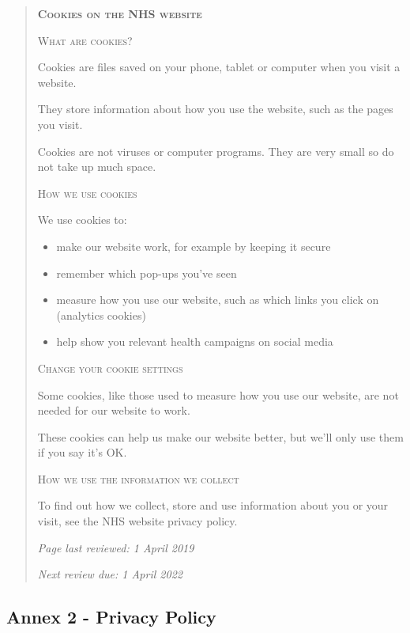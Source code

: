 \documentclass[twocolumn, letterpaper,13pt]{scrartcl}
\begin{document}
	\begin{quote}
        \textbf{\textsc{Cookies on the NHS website}}
        
        \textsc{What are cookies?}
        
        Cookies are files saved on your phone, tablet or computer when you visit a website.
        
        They store information about how you use the website, such as the pages you visit.
        
        Cookies are not viruses or computer programs. They are very small so do not take up much space.
        
        \textsc{How we use cookies}
        
        We use cookies to:
        
        \begin{itemize}
            \item make our website work, for example by keeping it secure
            \item remember which pop-ups you've seen
            \item measure how you use our website, such as which links you click on (analytics cookies)
            \item help show you relevant health campaigns on social media
        \end{itemize}
        
        \textsc{Change your cookie settings}
        
        Some cookies, like those used to measure how you use our website, are not needed for our website to work.
        
        These cookies can help us make our website better, but we'll only use them if you say it's OK.
        
        \textsc{How we use the information we collect}
        
        To find out how we collect, store and use information about you or your visit, see the NHS website privacy policy.
        
        \textit{Page last reviewed: 1 April 2019}
        
        \textit{Next review due: 1 April 2022}
	\end{quote}
	
	\subsection*{Annex 2 - Privacy Policy}
	
\end{document}
